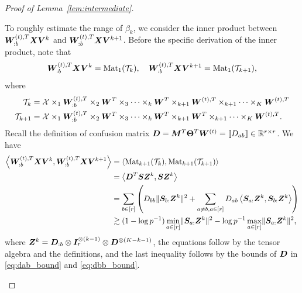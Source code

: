 \documentclass[lettersize,onecolumn,journal]{IEEEtran}
\theoremstyle{definition}
\theoremstyle{definition}
\newcommand{\of}[1]{\left(#1\right)}
\newcommand{\ang}[1]{\left\langle#1\right\rangle}
\begin{document}
\begin{proof}[Proof of Lemma~\ref{lem:intermediate}]
\begin{enumerate}
    To roughly estimate the range of $\beta_k$, we consider the inner product between $\bm{W}_{:b}^{(t),T} \bm X \bm{V}^k$ and $\bm{W}_{:b}^{(t),T} \bm X \bm{V}^{k+1}$. Before the specific derivation of the inner product, note that 
    \begin{equation}
        \bm{W}_{:b}^{(t),T} \bm X \bm{V}^k = \text{Mat}_1(\mathcal{T}_k), \quad  \bm{W}_{:b}^{(t),T} \bm X \bm{V}^{k+1} = \text{Mat}_1(\mathcal{T}_{k+1}),
    \end{equation}
    where 
    \begin{align}
        \mathcal{T}_k &= \mathcal{X} \times_1  \bm{W}_{:b}^{(t),T} \times_2 \bm{W}^T \times_3 \cdots \times_k \bm{W}^T \times_{k+1} \bm{W}^{(t),T} \times_{k+1} \cdots \times_K \bm{W}^{(t),T}\\
        \mathcal{T}_{k+1} &= \mathcal{X} \times_1  \bm{W}_{:b}^{(t),T} \times_2 \bm{W}^T \times_3 \cdots \times_k \bm{W}^T \times_{k+1} \bm{W}^{T} \times_{k+1} \cdots \times_K \bm{W}^{(t),T}. 
    \end{align}
    Recall the definition of confusion matrix $\bm{D} = \bm M^T \boldsymbol{\Theta}^T \bm{W}^{(t)} = \llbracket D_{ab} \rrbracket \in \mathbb{R}^{r \times r}$.
    We have 
    \begin{align}
         \ang{\mW_{:b}^{(t),T} \mX \mV^k , \mW_{:b}^{(t),T} \mX \mV^{k+1}} 
         &  =\ang{ \mat_{k+1}(\tT_k), \mat_{k+1}(\tT_{k+1}) } \label{eq:j11_tensormat} \\
         & =  \ang{ \mD^T \mS \mZ^k ,  \mS \mZ^k   }\\
         & = \sum_{b \in [r]} \of{ D_{bb} \onormSize{}{\mS_{b:}\mZ^k}^2 + \sum_{a \neq b, a \in [r]} D_{ab} \ang{\mS_{a:} \mZ^k, \mS_{b:} \mZ^k}} \\
         & \gtrsim (1 - \log p^{-1}) \min_{a \in [r]}\onormSize{}{\mS_{a:}\mZ^k}^2 - \log p^{-1} \max_{a \in [r]} \onormSize{}{\mS_{a:}\mZ^k}^2, \label{eq:j11inner}
    \end{align}
    where $\bm Z^k = \bm{D}_{:b} \otimes \bm I_r^{\otimes (k-1)} \otimes  \bm{D}^{\otimes (K-k-1)}$, the equations follow by the tensor algebra and the definitions, and the last inequality follows by the bounds of $\bm{D}$ in \eqref{eq:dab_bound} and \eqref{eq:dbb_bound}. 
    

\end{enumerate}
\end{proof}
\end{document}
